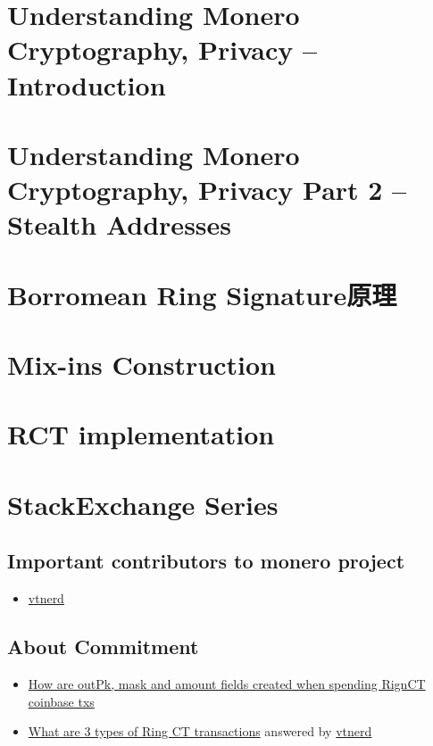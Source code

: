 \documentclass[a4paper,10pt]{report}
\begin{document}
\section{Understanding Monero Cryptography, Privacy -- Introduction}
	
\section{Understanding Monero Cryptography, Privacy Part 2 -- Stealth Addresses}
	
\section{Borromean Ring Signature原理}
	
\section{Mix-ins Construction}
	
\section{RCT implementation}
	
\section{StackExchange Series}
\subsection{Important contributors to monero project}
	\begin{itemize}
		\item \href{https://github.com/vtnerd}{vtnerd}
	\end{itemize}
\subsection{About Commitment}
	\begin{itemize}
		\item \href{https://monero.stackexchange.com/questions/3638/how-are-outpk-mask-and-amount-fields-created-when-spending-rignct-coinbase-txs/3639#3639}{How are outPk, mask and amount fields created when spending RignCT coinbase txs}
		\item \href{https://monero.stackexchange.com/questions/3348/what-are-3-types-of-ring-ct-transactions}{What are 3 types of Ring CT transactions} answered by \href{https://github.com/vtnerd}{vtnerd}
	\end{itemize}
\fi
\end{document}
